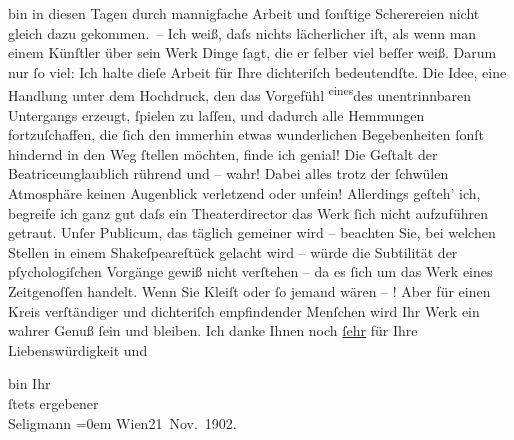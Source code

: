                bin in diesen Tagen durch mannigfache Arbeit und{ }ſonſtige Scherereien nicht gleich
               dazu gekommen. – Ich weiß, daſs nichts lächerlicher iſt, als wenn man einem Künſtler
               über sein {\pb}Werk Dinge{ }ſagt, die er{ }ſelber viel beſſer weiß. Darum nur{ }ſo viel: Ich halte
               dieſe Arbeit für Ihre dichteriſch bedeutendſte. Die Idee, eine Handlung unter dem
               Hochdruck, den das Vorgefühl \substVorne{}\textsuperscript{eines}\substDazwischen{}des\substHinten{} unentrinnbaren Untergangs erzeugt,{ }ſpielen zu laſſen, und dadurch alle
               Hemmungen fortzuſchaffen, die{ }ſich den immerhin etwas wunderlichen Begebenheiten{ }ſonſt hindernd in den Weg{ }ſtellen möchten, finde ich genial! Die Geſtalt der Beatriceunglaublich rührend und – wahr! Dabei
               alles trotz der{ }ſchwülen Atmosphäre keinen Augenblick verletzend oder unfein!
               Allerdings geſteh’ ich, begreife ich ganz gut daſs ein Theaterdirector das Werk{ }ſich
               nicht aufzuführen getraut. Unſer Publicum, das täglich gemeiner wird – beachten Sie,
               bei welchen Stellen in einem Shakeſpeareſtück
               gelacht wird – würde die Subtilität der pſychologiſchen Vorgänge gewiß nicht
               verſtehen – da es{ }ſich um das Werk eines Zeitgenoſſen handelt. Wenn Sie {\pb}Kleiſt oder{ }ſo jemand wären – \textsc{\label{K_L01250-2v}\label{K_L01250-2}}! Aber für einen Kreis verſtändiger und dichteriſch empfindender Menſchen wird
               Ihr Werk ein wahrer Genuß{ }ſein und bleiben. Ich danke Ihnen noch \uline{ſehr} für Ihre Liebenswürdigkeit und\pend
           
\pstart
           bin Ihr{\\[\baselineskip]}ſtets ergebener{\\[\baselineskip]}\spacefill\mbox{Seligmann}\pend
           \leftskip=0em{}
\pstart
           Wien21 Nov. 1902.\pend
           \endnumbering{}  \newcommand{\dateiname}{L01250}\newcommand{\titel}{Adalbert Seligmann an Arthur Schnitzler, 21. 11. 1902}\newcommand{\editorInnen}{Martin Anton Müller und Gerd-Hermann Susen}
